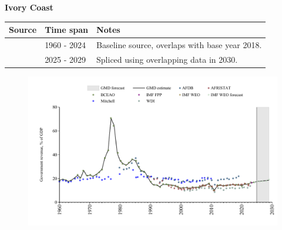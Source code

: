 \documentclass[12pt,a4paper,landscape]{article}
\begin{document}
\begin{adjustbox}{max totalsize={\paperwidth}{\paperheight},center}
\begin{minipage}[t][\textheight][t]{\textwidth}
\vspace*{0.5cm}
{}
\begin{center}
{\Large\bfseries Ivory Coast}
\end{center}
\vspace{0.5cm}
\begin{table}[H]
\centering
\small
\begin{tabular}{|l|l|l|}
\hline
\textbf{Source} & \textbf{Time span} & \textbf{Notes} \\
\hline
\rowcolor{white}\cite{BCEAO}& 1960 - 2024 &Baseline source, overlaps with base year 2018.\\
\rowcolor{lightgray}\cite{IMF_WEO_forecast}& 2025 - 2029 &Spliced using overlapping data in 2030.\\
\hline
\end{tabular}
\end{table}
\begin{figure}[H]
\centering
\includegraphics[width=\textwidth,height=0.6\textheight,keepaspectratio]{graphs/CIV_govrev_GDP.pdf}
\end{figure}
\end{minipage}
\end{adjustbox}
\end{document}
